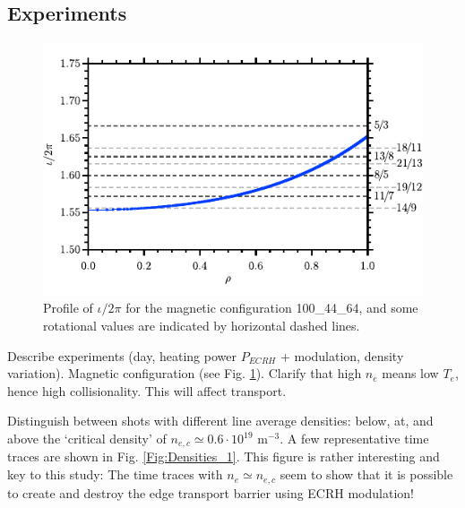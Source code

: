 \documentclass[preprint,12pt,authoryear]{elsarticle}
\begin{document}
\subsection{Experiments}


\begin{figure}[!ht]
   \includegraphics[width=264 pt]{Images/Figure1.pdf}
   \caption{Profile of $\iota/2\pi$ for the magnetic configuration 100\_44\_64, and some rotational values are indicated by horizontal dashed lines.}
   \label{Fig:Figure1}
\end{figure}

Describe experiments (day, heating power $P_{ECRH}$ +  modulation, density variation). Magnetic configuration (see Fig. \ref{Fig:Figure1}).
Clarify that high $n_e$ means low $T_e$, hence high collisionality. This will affect transport.

Distinguish between shots with different line average densities: below, at, and above the `critical density' of $n_{e,c} \simeq 0.6 \cdot 10^{19}$ m$^{-3}$.
A few representative time traces are shown in Fig. \ref{Fig:Densities_1}.
This figure is rather interesting and key to this study: The time traces with $n_e \simeq n_{e,c}$ seem to show that it is possible to create and destroy the edge transport barrier using ECRH modulation!
\end{document}
